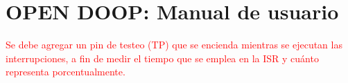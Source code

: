 







\tableofcontents
\newpage


%	
%
%	
%	
%	

\section{OPEN DOOP: Manual de usuario}
	\label{Ejercicio-4}
	

\begin{center}
\textcolor{red}{\LARGE{Se debe agregar un pin de testeo (TP) que se encienda mientras se ejecutan las interrupciones, a fin de medir el tiempo que se emplea en la ISR y cuánto representa porcentualmente.}}
\end{center}


